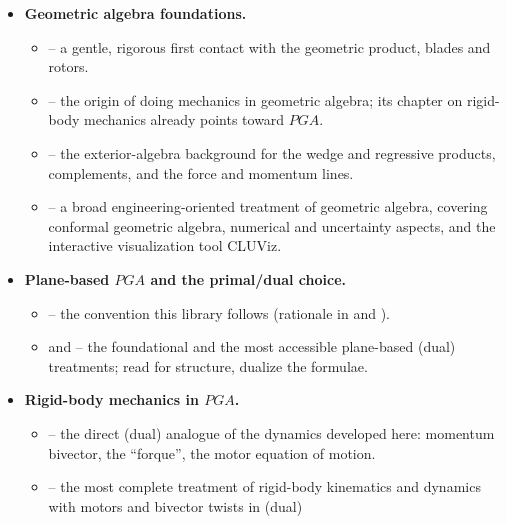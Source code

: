 {\setlength{\emergencystretch}{3em}
\begin{itemize}
    \item \textbf{Geometric algebra foundations.}
    \begin{itemize}
        \item \cite{Macdonald:2010} -- a gentle, rigorous first contact with the geometric
              product, blades and rotors.
        \item \cite{David_Hestenes_NFCM:1986} -- the origin of doing mechanics in
              geometric algebra; its chapter on rigid-body mechanics already points toward
              $PGA$.
        \item \cite{Browne_Grassmann-Algebra_Vol1:2012} -- the exterior-algebra background
              for the wedge and regressive products, complements, and the force and
              momentum lines.
        \item \cite{Perwass_GA_engineering:2009} -- a broad engineering-oriented treatment
              of geometric algebra, covering conformal geometric algebra, numerical and
              uncertainty aspects, and the interactive visualization tool CLUViz.
    \end{itemize}
    \item \textbf{Plane-based $PGA$ and the primal/dual choice.}
    \begin{itemize}
        \item \cite{Lengyel_pga-illuminated:2024} -- the convention this library follows
              (rationale in \cite{Lengyel_poor-foundations_GA:2024} and
              \cite{Lengyel_transwedge_product:2025}).
        \item \cite{Gunn_PGA:2020} and \cite{Plane-based_PGA_Dorst-DeKennik:2022} -- the
              foundational and the most accessible plane-based (dual) treatments; read for
              structure, dualize the formulae.
    \end{itemize}
    \item \textbf{Rigid-body mechanics in $PGA$.}
    \begin{itemize}
        \item \cite{Dynamics_in_PGA_plane-based_Dorst-DeKennik:2023} -- the direct (dual)
              analogue of the dynamics developed here: momentum bivector, the ``forque'',
              the motor equation of motion.
        \item \cite{Gunn_thesis_CayleyKlein:2011} -- the most complete treatment of
              rigid-body kinematics and dynamics with motors and bivector twists in (dual)

\end{itemize}
\end{itemize}}
